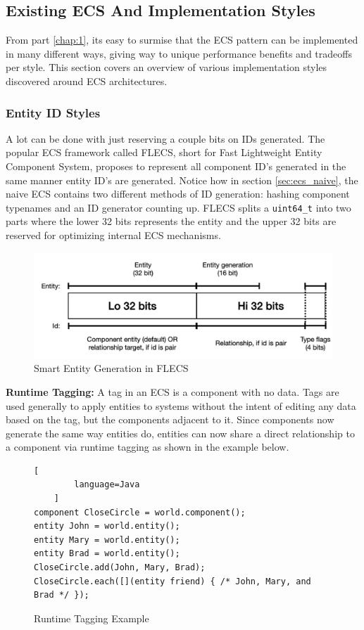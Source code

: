 \subsection{Existing ECS And Implementation Styles}
From part \ref{chap:1}, its easy to surmise that the ECS pattern can be implemented in many different ways, giving way to unique performance benefits and tradeoffs per style. This section covers an overview of various implementation styles discovered around ECS architectures.

\subsubsection{Entity ID Styles}
A lot can be done with just reserving a couple bits on IDs generated. The popular ECS framework called FLECS, short for Fast 
Lightweight Entity Component System, proposes to represent all component ID's generated in the same manner entity ID's are generated. Notice how in section \ref{sec:ecs_naive}, the naive ECS contains two different methods of ID generation: hashing component typenames and an ID generator counting up. FLECS splits a \texttt{uint64\_t} into two parts where the lower 32 bits represents the entity and the upper 32 bits are reserved for optimizing internal ECS mechanisms.

\begin{figure}[H]
    \centering
    \includegraphics[width=0.5\linewidth]{resources/entity_generation.png}
    \caption{Smart Entity Generation in FLECS}
    \label{fig:entity_generation}
\end{figure}

\textbf{Runtime Tagging:}
A tag in an ECS is a component with no data. Tags are used generally to apply entities to systems without the intent of editing any data based on the tag, but the components adjacent to it. Since components now generate the same way entities
do, entities can now share a direct relationship to a component via runtime tagging as shown in the example below. \cite{RomeoPHD}

\begin{figure}[H]
    \begin{lstlisting}[
        language=Java
    ]
component CloseCircle = world.component();
entity John = world.entity();
entity Mary = world.entity();
entity Brad = world.entity();
CloseCircle.add(John, Mary, Brad);
CloseCircle.each([](entity friend) { /* John, Mary, and Brad */ });
\end{lstlisting}
    \caption{Runtime Tagging Example}
    \label{code:runtime_tagging}
\end{figure}

